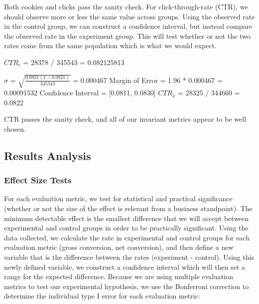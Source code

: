 \documentclass[paper=a4, fontsize=11pt]{scrartcl} %
\numberwithin{equation}{section} %
\numberwithin{figure}{section} %
\numberwithin{table}{section} %
\begin{document}
Both cookies and clicks pass the sanity check.  For click-through-rate (CTR), we should observe more or less the same value across groups.  Using the observed rate in the control group, we can construct a confidence interval, but instead compare the observed rate in the experiment group.  This will test whether or not the two rates come from the same population which is what we would expect.
\newline

$CTR_{c}$ = 28378 / 345543 = 0.082125813

$\sigma$ = $\sqrt{\frac{0.0821(1-0.0821)}{345543}}$ = 0.000467
\newline
Margin of Error = 1.96 * 0.000467 = 0.00091532
\newline
Confidence Interval = [0.0811, 0.0830]
\newline
$CTR_{x}$ = 28325 / 344660 = 0.0822
\newline

CTR passes the sanity check, and all of our invariant metrics appear to be well chosen. \newline


\subsection{Results Analysis}

\subsubsection{Effect Size Tests}

For each evaluation metric, we test for statistical and practical significance (whether or not the size of the effect is relevant from a business standpoint).  The minimum detectable effect is the smallest difference that we will accept between experimental and control groups in order to be practically significant.  Using the data collected, we calculate the rate in experimental and control groups for each evaluation metric (gross conversion, net conversion), and then define a new variable that is the difference between the rates (experiment - control).  Using this newly defined variable, we construct a confidence interval which will then set a range for the expected difference.  Because we are using multiple evaluation metrics to test our experimental hypothesis, we use the Bonferroni correction to determine the individual type I error for each evaluation metric: \newline
\end{document}
